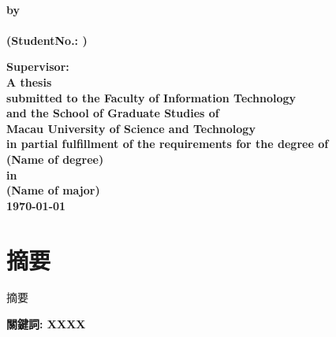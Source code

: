 \documentclass[12pt, a4paper]{report}
\begin{document}
\begin{titlepage}
\begin{center}
    \bf\sizefont{18pt}\Etitle\\
    \vspace{0.25in}
    \large
    by \\
    \vspace{0.25in}
    \large
    \Ename \\
    \bf\normalsize
     (StudentNo.: \Stuno)\\
    \begin{center}
    \vspace{0.7in}
    \bf\normalsize
        Supervisor: \Supervisor\\
    \vspace{0.8in}
    \bf\normalsize
        A thesis\\
        submitted to the Faculty of Information Technology\\
        and the School of Graduate Studies of \\
        Macau University of Science and Technology\\
        in partial fulfillment of the requirements for the degree of\\
        (Name of degree)\\
        in\\
        (Name of major)\\
    \vspace{1in}
    \today
  \end{center}
  \end{center}
  \end{titlepage}


\pagestyle{fancy}
\setlength{\parindent}{0.6cm}

\lhead{\Etitle}
\setlength{\parskip}{0pt}    
\chapter*{摘要} \par
\bigskip
\hspace*{1em}

摘要

\vspace{2em}
\par \noindent\textbf{關鍵詞: XXXX}
\end{document}
